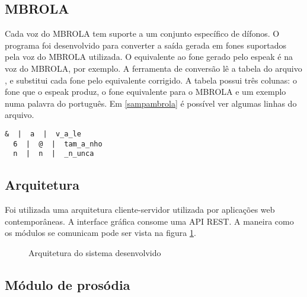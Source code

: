 \subsection{MBROLA}
Cada voz do MBROLA tem suporte a um conjunto específico de dífonos. O programa
 foi desenvolvido para converter a saída gerada em fones
suportados pela voz do MBROLA utilizada. O equivalente ao fone \code{&} gerado
pelo espeak é  na voz do MBROLA, por exemplo. A ferramenta de conversão
lê a tabela do arquivo , e substitui cada fone pelo
equivalente corrigido. A tabela possui três colunas: o fone que o espeak
produz, o fone equivalente para o MBROLA e um exemplo numa palavra do português.
Em \ref{sampambrola} é possível ver algumas linhas do arquivo.

\begin{lstlisting}[caption=Linhas da tabela de conversão, label=sampambrola]
  &  |  a  |  v_a_le
  6  |  @  |  tam_a_nho
  n  |  n  |  _n_unca
\end{lstlisting}

\subsection{Arquitetura}
Foi utilizada uma arquitetura cliente-servidor utilizada por aplicações web
contemporâneas. A interface gráfica consome uma API REST. A maneira como os
módulos se comunicam pode ser vista na figura \ref{fig:arch}.

\begin{figure}[!htbp]
\centering
{}
\caption{Arquitetura do sistema desenvolvido}
\label{fig:arch}
\end{figure}

\subsection{Módulo de prosódia}

